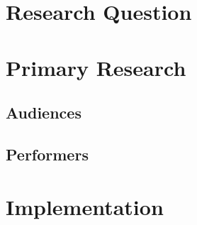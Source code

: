 \documentclass[12pt]{report}
\begin{document}
\pagestyle{plain}					%




\clearpage
\setcounter{page}{2}















%



%



\tableofcontents
\listoffigures
\listoftables

\cleardoublepage
\pagestyle{fancy}				%








\chapter{Research Question}

\chapter{Primary Research}
\section{Audiences}
\section{Performers}



\chapter{Implementation}
\end{document}
